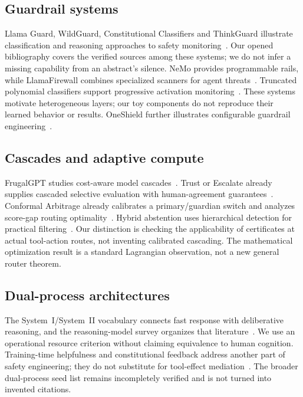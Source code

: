 \documentclass[lettersize,journal]{IEEEtran}
\begin{document}
\subsection{Guardrail systems}
Llama Guard, WildGuard, Constitutional Classifiers and ThinkGuard
illustrate classification and reasoning approaches to safety
monitoring~\cite{arxiv231206674,arxiv240618495,arxiv250118837,arxiv250213458}.
Our opened bibliography covers the verified sources among these systems;
we do not infer a missing capability from an abstract's silence.
NeMo provides programmable rails, while LlamaFirewall combines specialized
scanners for agent threats~\cite{arxiv231010501,arxiv250503574}.
Truncated polynomial classifiers support progressive activation
monitoring~\cite{arxiv250926238}. These systems motivate heterogeneous layers;
our toy components do not reproduce their learned behavior or results.
OneShield further illustrates configurable guardrail
engineering~\cite{arxiv250721170}.

\subsection{Cascades and adaptive compute}
FrugalGPT studies cost-aware model cascades~\cite{arxiv230505176}.
Trust or Escalate already supplies cascaded selective evaluation with
human-agreement guarantees~\cite{arxiv240718370}. Conformal Arbitrage already
calibrates a primary/guardian switch and analyzes score-gap routing
optimality~\cite{arxiv250600911}. Hybrid abstention uses hierarchical detection
for practical filtering~\cite{arxiv260215391}. Our distinction is checking
the applicability of certificates at actual tool-action routes, not inventing
calibrated cascading. The mathematical optimization result is a standard
Lagrangian observation, not a new general router theorem.

\subsection{Dual-process architectures}
The System~I/System~II vocabulary connects fast response with deliberative
reasoning, and the reasoning-model survey organizes that
literature~\cite{arxiv250217419}. We use an operational resource criterion
without claiming equivalence to human cognition. Training-time helpfulness
and constitutional feedback address another part of safety engineering;
they do not substitute for tool-effect mediation~\cite{arxiv220405862,arxiv221208073}.
The broader dual-process seed list remains incompletely verified and is not
turned into invented citations.
\end{document}
